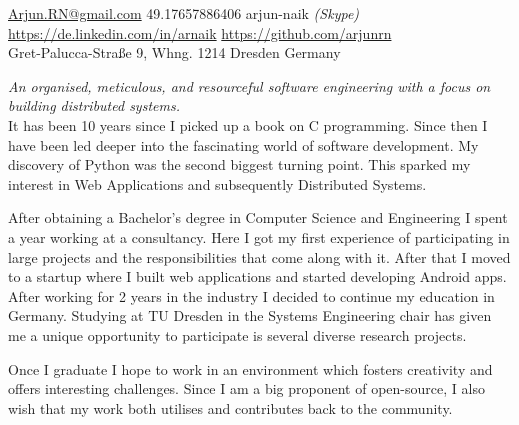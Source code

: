 \documentclass[10pt,a4paper]{article}
\begin{document}
\sloppy  %


\nobreakvspace{0.3em}  %

\noindent\href{mailto:Arjun.RN@gmail.com}{Arjun.RN\mbox{}@\mbox{}gmail.com}\sbull
\textsmaller{+}49.17657886406
\sbull arjun-naik \emph{(Skype)}
\\
\sbull
\href{https://de.linkedin.com/in/arnaik}{https://de.linkedin.com/in/arnaik}
\sbull
\href{https://github.com/arjunrn}{https://github.com/arjunrn}
\\
Gret-Palucca-Stra{\ss}e 9, Whng. 1214\sbull
Dresden\sbull
Germany

\spacedhrule{0.9em}{-0.4em}  %


\vspace{-1.3em}  %
\begin{multicols}{2}  %
\noindent \emph{An organised, meticulous, and resourceful software engineering with a focus on building distributed systems.}
\\
It has been 10 years since I picked up a book on C programming. Since then I have been led deeper into the fascinating world of software development. My discovery of Python was the second biggest turning point. This sparked my interest in Web Applications and subsequently Distributed Systems. 

After obtaining a Bachelor's degree in Computer Science and Engineering I spent a year working at a consultancy. Here I got my first experience of participating in large projects and the responsibilities that come along with it. After that I moved to a startup where I built web applications and started developing Android apps. After working for 2 years in the industry I decided to continue my education in Germany. Studying at TU Dresden in the Systems Engineering chair has given me a unique opportunity to participate is several diverse research projects.

Once I graduate I hope to work in an environment which fosters creativity and offers interesting challenges. Since I am a big proponent of open-source, I also wish that my work both utilises and contributes back to the community.

\end{multicols}
\end{document}
